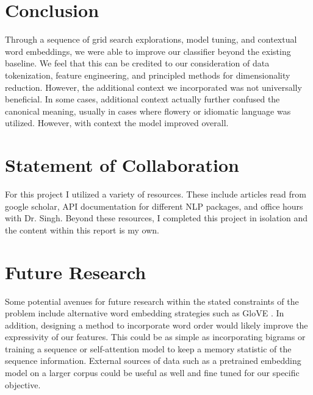 \documentclass[11pt,a4paper]{article}
\begin{document}
\section{Conclusion}%
\label{sec:conclusion}

Through a sequence of grid search explorations, model tuning, and contextual word embeddings, we were able to improve our classifier beyond the existing baseline. We feel that this can be credited to our consideration of data tokenization, feature engineering, and principled methods for dimensionality reduction. However, the additional context we incorporated was not universally beneficial. In some cases, additional context actually further confused the canonical meaning, usually in cases where flowery or idiomatic language was utilized. However, with context the model improved overall.




\section{Statement of Collaboration}
For this project I utilized a variety of resources. These include articles read from google scholar, API documentation for different NLP packages, and office hours with Dr. Singh. Beyond these resources, I completed this project in isolation and the content within this report is my own.






\appendix

\section{Future Research}%
\label{sec:future_research}
Some potential avenues for future research within the stated constraints of the problem include alternative word embedding strategies such as GloVE \cite{pennington2014glove}. In addition, designing a method to incorporate word order would likely improve the expressivity of our features. This could be as simple as incorporating bigrams or training a sequence \cite{hochreiter1997long} or self-attention \cite{vaswani2017attention} model to keep a memory statistic of the sequence information. External sources of data such as a pretrained embedding model on a larger corpus could be useful as well and fine tuned for our specific objective.
\end{document}
